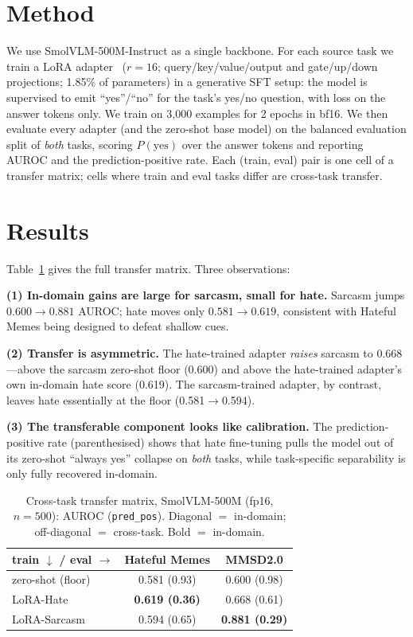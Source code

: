 \documentclass[sigconf,nonacm]{acmart}
\begin{document}
\section{Method}
We use SmolVLM-500M-Instruct as a single backbone. For each source task we train a LoRA
adapter~\cite{hu2022lora} ($r{=}16$; query/key/value/output and gate/up/down projections;
1.85\% of parameters) in a generative SFT setup: the model is supervised to emit
``yes''/``no'' for the task's yes/no question, with loss on the answer tokens only. We
train on 3{,}000 examples for 2 epochs in bf16. We then evaluate every adapter (and the
zero-shot base model) on the balanced evaluation split of \emph{both} tasks, scoring
$P(\text{yes})$ over the answer tokens and reporting AUROC and the prediction-positive
rate. Each (train, eval) pair is one cell of a transfer matrix; cells where train and
eval tasks differ are cross-task transfer.

\section{Results}
Table~\ref{tab:matrix} gives the full transfer matrix. Three observations:

\noindent\textbf{(1) In-domain gains are large for sarcasm, small for hate.}
Sarcasm jumps $0.600\to0.881$ AUROC; hate moves only $0.581\to0.619$, consistent with
Hateful Memes being designed to defeat shallow cues.

\noindent\textbf{(2) Transfer is asymmetric.} The hate-trained adapter \emph{raises}
sarcasm to 0.668---above the sarcasm zero-shot floor (0.600) and above the hate-trained
adapter's own in-domain hate score (0.619). The sarcasm-trained adapter, by contrast,
leaves hate essentially at the floor (0.581$\to$0.594).

\noindent\textbf{(3) The transferable component looks like calibration.} The
prediction-positive rate (parenthesised) shows that hate fine-tuning pulls the model out
of its zero-shot ``always yes'' collapse on \emph{both} tasks, while task-specific
separability is only fully recovered in-domain.

\begin{table}[t]
\centering
\caption{Cross-task transfer matrix, SmolVLM-500M (fp16, $n{=}500$): AUROC
(\texttt{pred\_pos}). Diagonal $=$ in-domain; off-diagonal $=$ cross-task. Bold $=$
in-domain.}
\label{tab:matrix}
\begin{tabular}{lcc}
\toprule
\textbf{train} $\downarrow$ / \textbf{eval} $\rightarrow$ & Hateful Memes & MMSD2.0 \\
\midrule
zero-shot (floor) & 0.581 (0.93) & 0.600 (0.98) \\
LoRA-Hate         & \textbf{0.619 (0.36)} & 0.668 (0.61) \\
LoRA-Sarcasm      & 0.594 (0.65) & \textbf{0.881 (0.29)} \\
\bottomrule
\end{tabular}
\end{table}
\end{document}
